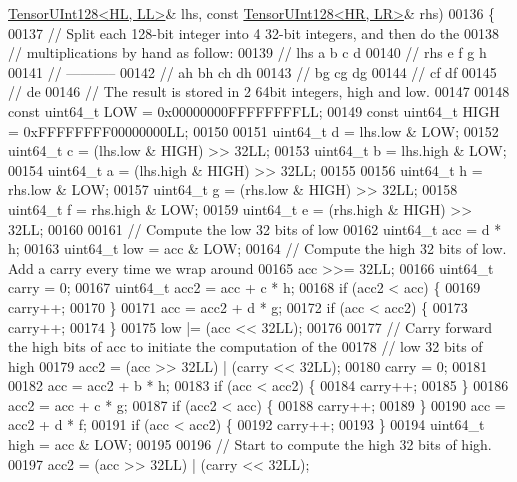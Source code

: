 \begin{DoxyCode}
      \hyperlink{struct_eigen_1_1internal_1_1_tensor_u_int128}{TensorUInt128<HL, LL>}& lhs, \textcolor{keyword}{const} \hyperlink{struct_eigen_1_1internal_1_1_tensor_u_int128}{TensorUInt128<HR, LR>}& rhs)
00136 \{
00137   \textcolor{comment}{// Split each 128-bit integer into 4 32-bit integers, and then do the}
00138   \textcolor{comment}{// multiplications by hand as follow:}
00139   \textcolor{comment}{//   lhs      a  b  c  d}
00140   \textcolor{comment}{//   rhs      e  f  g  h}
00141   \textcolor{comment}{//           -----------}
00142   \textcolor{comment}{//           ah bh ch dh}
00143   \textcolor{comment}{//           bg cg dg}
00144   \textcolor{comment}{//           cf df}
00145   \textcolor{comment}{//           de}
00146   \textcolor{comment}{// The result is stored in 2 64bit integers, high and low.}
00147 
00148   \textcolor{keyword}{const} uint64\_t LOW = 0x00000000FFFFFFFFLL;
00149   \textcolor{keyword}{const} uint64\_t HIGH = 0xFFFFFFFF00000000LL;
00150 
00151   uint64\_t d = lhs.low & LOW;
00152   uint64\_t c = (lhs.low & HIGH) >> 32LL;
00153   uint64\_t b = lhs.high & LOW;
00154   uint64\_t a = (lhs.high & HIGH) >> 32LL;
00155 
00156   uint64\_t h = rhs.low & LOW;
00157   uint64\_t g = (rhs.low & HIGH) >> 32LL;
00158   uint64\_t f = rhs.high & LOW;
00159   uint64\_t e = (rhs.high & HIGH) >> 32LL;
00160 
00161   \textcolor{comment}{// Compute the low 32 bits of low}
00162   uint64\_t acc = d * h;
00163   uint64\_t low = acc & LOW;
00164   \textcolor{comment}{//  Compute the high 32 bits of low. Add a carry every time we wrap around}
00165   acc >>= 32LL;
00166   uint64\_t carry = 0;
00167   uint64\_t acc2 = acc + c * h;
00168   \textcolor{keywordflow}{if} (acc2 < acc) \{
00169     carry++;
00170   \}
00171   acc = acc2 + d * g;
00172   \textcolor{keywordflow}{if} (acc < acc2) \{
00173     carry++;
00174   \}
00175   low |= (acc << 32LL);
00176 
00177   \textcolor{comment}{// Carry forward the high bits of acc to initiate the computation of the}
00178   \textcolor{comment}{// low 32 bits of high}
00179   acc2 = (acc >> 32LL) | (carry << 32LL);
00180   carry = 0;
00181 
00182   acc = acc2 + b * h;
00183   \textcolor{keywordflow}{if} (acc < acc2) \{
00184     carry++;
00185   \}
00186   acc2 = acc + c * g;
00187   \textcolor{keywordflow}{if} (acc2 < acc) \{
00188     carry++;
00189   \}
00190   acc = acc2 + d * f;
00191   \textcolor{keywordflow}{if} (acc < acc2) \{
00192     carry++;
00193   \}
00194   uint64\_t high = acc & LOW;
00195 
00196   \textcolor{comment}{// Start to compute the high 32 bits of high.}
00197   acc2 = (acc >> 32LL) | (carry << 32LL);

\end{DoxyCode}
